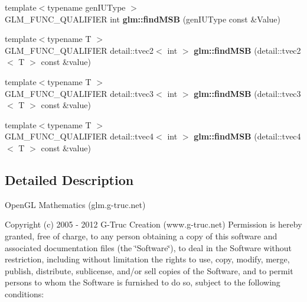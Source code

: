 \begin{DoxyCompactItemize}
\item 
\hypertarget{namespaceglm_adc22c75c7dd35bacf86237d8bfe8b53a}{{\footnotesize template$<$typename gen\-I\-U\-Type $>$ }\\\-G\-L\-M\-\_\-\-F\-U\-N\-C\-\_\-\-Q\-U\-A\-L\-I\-F\-I\-E\-R int {\bfseries glm\-::find\-M\-S\-B} (gen\-I\-U\-Type const \&\-Value)}\label{namespaceglm_adc22c75c7dd35bacf86237d8bfe8b53a}

\item 
\hypertarget{namespaceglm_a242a34bcfa82ccbecb081091cfc5dcd3}{{\footnotesize template$<$typename T $>$ }\\\-G\-L\-M\-\_\-\-F\-U\-N\-C\-\_\-\-Q\-U\-A\-L\-I\-F\-I\-E\-R \*
detail\-::tvec2$<$ int $>$ {\bfseries glm\-::find\-M\-S\-B} (detail\-::tvec2$<$ \-T $>$ const \&value)}\label{namespaceglm_a242a34bcfa82ccbecb081091cfc5dcd3}

\item 
\hypertarget{namespaceglm_a20b9f76c43fa5f5e8f2f735bf0ac05be}{{\footnotesize template$<$typename T $>$ }\\\-G\-L\-M\-\_\-\-F\-U\-N\-C\-\_\-\-Q\-U\-A\-L\-I\-F\-I\-E\-R \*
detail\-::tvec3$<$ int $>$ {\bfseries glm\-::find\-M\-S\-B} (detail\-::tvec3$<$ \-T $>$ const \&value)}\label{namespaceglm_a20b9f76c43fa5f5e8f2f735bf0ac05be}

\item 
\hypertarget{namespaceglm_aa14dd21dcab7f0510096f33e71a6bad6}{{\footnotesize template$<$typename T $>$ }\\\-G\-L\-M\-\_\-\-F\-U\-N\-C\-\_\-\-Q\-U\-A\-L\-I\-F\-I\-E\-R \*
detail\-::tvec4$<$ int $>$ {\bfseries glm\-::find\-M\-S\-B} (detail\-::tvec4$<$ \-T $>$ const \&value)}\label{namespaceglm_aa14dd21dcab7f0510096f33e71a6bad6}

\end{DoxyCompactItemize}


\subsection{\-Detailed \-Description}
\-Open\-G\-L \-Mathematics (glm.\-g-\/truc.\-net)

\-Copyright (c) 2005 -\/ 2012 \-G-\/\-Truc \-Creation (www.\-g-\/truc.\-net) \-Permission is hereby granted, free of charge, to any person obtaining a copy of this software and associated documentation files (the \char`\"{}\-Software\char`\"{}), to deal in the \-Software without restriction, including without limitation the rights to use, copy, modify, merge, publish, distribute, sublicense, and/or sell copies of the \-Software, and to permit persons to whom the \-Software is furnished to do so, subject to the following conditions\-:

